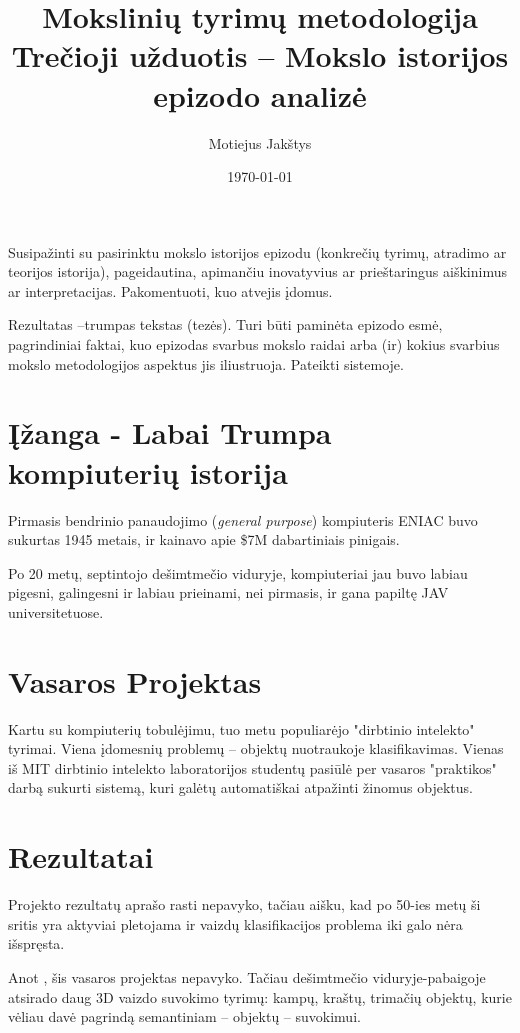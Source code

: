\documentclass{article}
\title{Mokslinių tyrimų metodologija\\ \vspace{4mm} 
Trečioji užduotis -- Mokslo istorijos epizodo analizė}
\author{Motiejus Jakštys}
\date{\today}
\begin{document}
\maketitle

Susipažinti su pasirinktu mokslo istorijos epizodu (konkrečių tyrimų, atradimo
ar teorijos istorija), pageidautina, apimančiu inovatyvius ar prieštaringus
aiškinimus ar interpretacijas. Pakomentuoti, kuo atvejis įdomus.

Rezultatas –trumpas tekstas (tezės). Turi būti paminėta epizodo esmė,
pagrindiniai faktai, kuo epizodas svarbus mokslo raidai arba (ir) kokius
svarbius mokslo metodologijos aspektus jis iliustruoja. Pateikti sistemoje.

\section{Įžanga - Labai Trumpa kompiuterių istorija}

Pirmasis bendrinio panaudojimo ({\it general purpose}) kompiuteris ENIAC buvo
sukurtas 1945 metais, ir kainavo apie \$7M dabartiniais pinigais.

Po 20 metų, septintojo dešimtmečio viduryje, kompiuteriai jau buvo labiau
pigesni, galingesni ir labiau prieinami, nei pirmasis, ir gana papiltę JAV
universitetuose.

\section{Vasaros Projektas}

Kartu su kompiuterių tobulėjimu, tuo metu populiarėjo "dirbtinio intelekto"
tyrimai. Viena įdomesnių problemų -- objektų nuotraukoje klasifikavimas. Vienas
iš MIT dirbtinio intelekto laboratorijos studentų pasiūlė per vasaros
"praktikos" darbą sukurti sistemą, kuri galėtų automatiškai atpažinti žinomus
objektus\cite{papert1966summer}.

\section{Rezultatai}

Projekto rezultatų aprašo rasti nepavyko, tačiau aišku, kad po 50-ies metų ši
sritis yra aktyviai pletojama ir vaizdų klasifikacijos problema iki galo nėra
išspręsta.

Anot \cite{szeliski2010computer}, šis vasaros projektas nepavyko. Tačiau
dešimtmečio viduryje-pabaigoje atsirado daug 3D vaizdo suvokimo tyrimų: kampų,
kraštų, trimačių objektų, kurie vėliau davė pagrindą semantiniam -- objektų --
suvokimui.

{}

\end{document}
